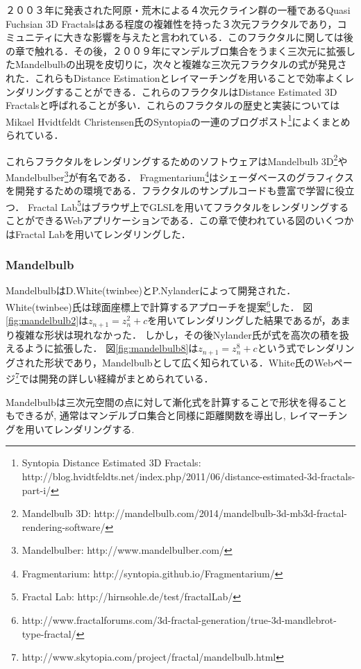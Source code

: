 ２００３年に発表された阿原・荒木\cite{sphairahedra}による４次元クライン群の一種であるQuasi Fuchsian 3D Fractalsはある程度の複雑性を持った３次元フラクタルであり，コミュニティに大きな影響を与えたと言われている．このフラクタルに関しては後の章で触れる．その後，２００９年にマンデルブロ集合をうまく三次元に拡張したMandelbulbの出現を皮切りに，次々と複雑な三次元フラクタルの式が発見された．これらもDistance Estimationとレイマーチングを用いることで効率よくレンダリングすることができる．これらのフラクタルはDistance Estimated 3D Fractalsと呼ばれることが多い．これらのフラクタルの歴史と実装についてはMikael Hvidtfeldt Christensen氏のSyntopiaの一連のブログポスト\footnote{Syntopia Distance Estimated 3D Fractals: http://blog.hvidtfeldts.net/index.php/2011/06/distance-estimated-3d-fractals-part-i/}によくまとめられている．

これらフラクタルをレンダリングするためのソフトウェアはMandelbulb 3D\footnote{Mandelbulb 3D: http://mandelbulb.com/2014/mandelbulb-3d-mb3d-fractal-rendering-software/}やMandelbulber\footnote{Mandelbulber: http://www.mandelbulber.com/}が有名である．
Fragmentarium\footnote{Fragmentarium: http://syntopia.github.io/Fragmentarium/}はシェーダベースのグラフィクスを開発するための環境である．フラクタルのサンプルコードも豊富で学習に役立つ．
Fractal Lab\footnote{Fractal Lab: http://hirnsohle.de/test/fractalLab/}はブラウザ上でGLSLを用いてフラクタルをレンダリングすることができるWebアプリケーションである．この章で使われている図のいくつかはFractal Labを用いてレンダリングした．

\subsubsection{Mandelbulb}

MandelbulbはD.White(twinbee)とP.Nylanderによって開発された．
White(twinbee)氏は球面座標上で計算するアプローチを提案\footnote{http://www.fractalforums.com/3d-fractal-generation/true-3d-mandlebrot-type-fractal/}した．
図\ref{fig:mandelbulb2}は$z_{n+1} = z_n^2 + c$を用いてレンダリングした結果であるが，あまり複雑な形状は現れなかった．
しかし，その後Nylander氏が式を高次の積を扱えるように拡張した．
図\ref{fig:mandelbulb8}は$z_{n+1} = z_n^8 + c $という式でレンダリングされた形状であり，Mandelbulbとして広く知られている．White氏のWebページ\footnote{http://www.skytopia.com/project/fractal/mandelbulb.html}では開発の詳しい経緯がまとめられている．

Mandelbulbは三次元空間の点に対して漸化式を計算することで形状を得ることもできるが, 通常はマンデルブロ集合と同様に距離関数を導出し, レイマーチングを用いてレンダリングする.

